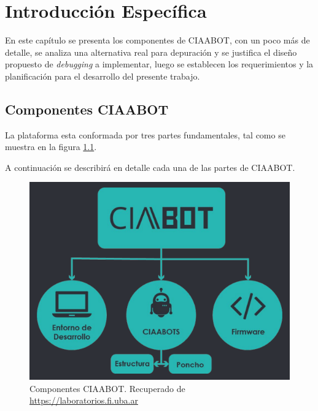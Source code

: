 \chapter{Introducción Específica} %

\label{Chapter2}

En este capítulo se presenta los componentes de CIAABOT, con un poco más
de detalle, se analiza una alternativa real para depuración y se justifica el diseño
propuesto de \emph{debugging} a implementar, luego se establecen los requerimientos y
la planificación para el desarrollo del presente trabajo.

\section{Componentes CIAABOT}
\label{sec:Componentes CIAABOT}
La plataforma esta conformada por tres partes fundamentales, tal como se muestra en la figura \ref{fig:componentesCiaabot}. 

A continuación se describirá en detalle cada una de las partes de CIAABOT.

\begin{figure}[h]
	\centering
	\includegraphics[scale=.50]{./Figures/componentesCiabot.png}
	\caption{Componentes CIAABOT. Recuperado de \url{https://laboratorios.fi.uba.ar}}
	\label{fig:componentesCiaabot}
\end{figure}


